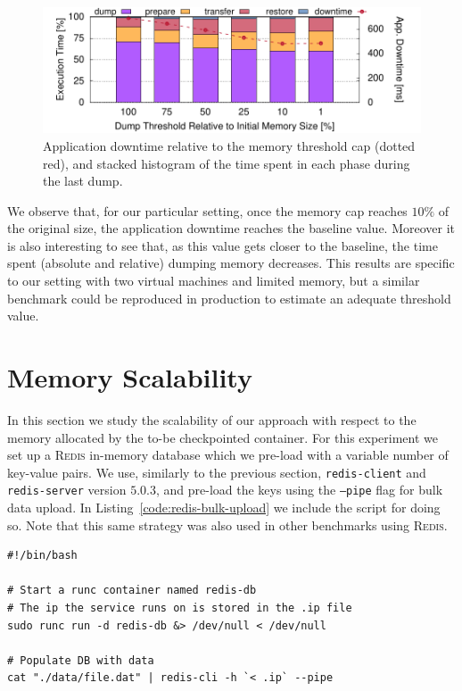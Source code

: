 \begin{figure}[h!]
    \centering
    \includegraphics[width=\textwidth]{./figs/downtime/downtime.pdf}
    \caption[Application Downtime Relative to Threshold]{Application downtime relative to the memory threshold cap (dotted red), and stacked histogram of the time spent in each phase during the last dump.\label{fig:downtime}}
\end{figure}

We observe that, for our particular setting, once the memory cap reaches $10\%$ of the original size, the application downtime reaches the baseline value.
Moreover it is also interesting to see that, as this value gets closer to the baseline, the time spent (absolute and relative) dumping memory decreases.
This results are specific to our setting with two virtual machines and limited memory, but a similar benchmark could be reproduced in production to estimate an adequate threshold value.

\section{Memory Scalability}

In this section we study the scalability of our approach with respect to the memory allocated by the to-be checkpointed container.
For this experiment we set up a \textsc{Redis} in-memory database which we pre-load with a variable number of key-value pairs.
We use, similarly to the previous section, \texttt{redis-client} and \texttt{redis-server} version $5.0.3$, and pre-load the keys using the \texttt{--pipe} flag for bulk data upload.
In Listing~\ref{code:redis-bulk-upload} we include the script for doing so.
Note that this same strategy was also used in other benchmarks using \textsc{Redis}.
\begin{lstlisting}[style=Bash,caption={Snippet for bulk data upload to a Redis database.},label={code:redis-bulk-upload}]
#!/bin/bash

# Start a runc container named redis-db
# The ip the service runs on is stored in the .ip file
sudo runc run -d redis-db &> /dev/null < /dev/null

# Populate DB with data
cat "./data/file.dat" | redis-cli -h `< .ip` --pipe
\end{lstlisting}

